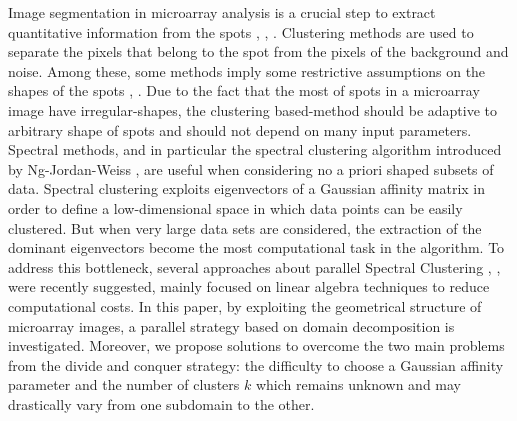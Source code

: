 \documentclass[runningheads,a4paper]{llncs}
\begin{document}
Image segmentation in microarray analysis is a crucial step to extract
quantitative information from the spots \cite{rueda2009pattern},
\cite{uslan2010microarray}, \cite{giannakeas2008image}.
Clustering methods are used to separate the pixels that belong to the spot
from the pixels of the background and noise.  Among these, some methods imply
some restrictive  assumptions on the shapes of the spots
\cite{yang2001analysis}, \cite{rueda2005new}.  Due to the fact that the most
of spots in a microarray image have irregular-shapes, the clustering
based-method should be adaptive to arbitrary shape of spots and    should not
depend on many input parameters.  
Spectral methods, and in particular the spectral clustering algorithm
introduced by Ng-Jordan-Weiss \cite{speC}, are  useful when considering no a
priori shaped subsets of data. Spectral clustering exploits eigenvectors of a
Gaussian affinity matrix in order to define a low-dimensional space in which
data points can be easily clustered. But when very large data sets are
considered, the extraction of the dominant eigenvectors become the most
computational task in the algorithm. To address this bottleneck, several
approaches about parallel Spectral Clustering \cite{song}, \cite{fowlkes},
\cite{Chen10} were recently suggested, mainly focused on linear  algebra
techniques to reduce computational costs. In this paper, by exploiting the
geometrical structure of microarray images, a parallel strategy based on
domain decomposition is investigated. Moreover, we propose solutions to
overcome the two main problems from the
divide and conquer strategy: the difficulty to choose a Gaussian affinity
parameter and the number of clusters $k$ which remains unknown and may
drastically vary from one subdomain to the other.
    
\end{document}
